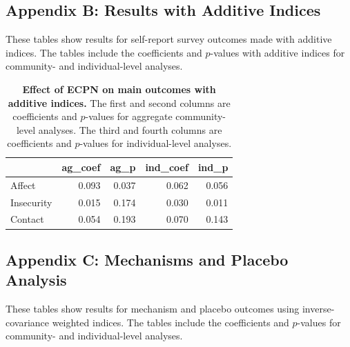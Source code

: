 \documentclass[11pt]{article}
\begin{document}
\hypertarget{appendix-b-results-with-additive-indices}{%
\subsection{Appendix B: Results with Additive
Indices}\label{appendix-b-results-with-additive-indices}}

These tables show results for self-report survey outcomes made with
additive indices. The tables include the coefficients and \(p\)-values
with additive indices for community- and individual-level analyses.

\begin{table}[H]
\begin{center}

\begin{tabular}{l|r|r|r|r}
\hline
  & ag\_coef & ag\_p & ind\_coef & ind\_p\\
\hline
Affect & 0.093 & 0.037 & 0.062 & 0.056\\
\hline
Insecurity & 0.015 & 0.174 & 0.030 & 0.011\\
\hline
Contact & 0.054 & 0.193 & 0.070 & 0.143\\
\hline
\end{tabular}


\caption{\label{tab:add_ind_tab}\textbf{Effect of ECPN on main outcomes with additive indices.} The first and second columns are coefficients and $p$-values for aggregate community-level analyses.  The third and fourth columns are coefficients and $p$-values for individual-level analyses.}
\end{center}
\end{table}

\hypertarget{appendix-c-mechanisms-and-placebo-analysis}{%
\subsection{Appendix C: Mechanisms and Placebo
Analysis}\label{appendix-c-mechanisms-and-placebo-analysis}}

These tables show results for mechanism and placebo outcomes using
inverse-covariance weighted indices. The tables include the coefficients
and \(p\)-values for community- and individual-level analyses.
\end{document}
